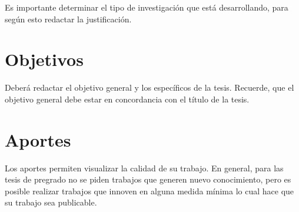 Es importante determinar el tipo de investigación que está desarrollando, para según esto redactar la justificación.

\section{Objetivos}
Deberá redactar el objetivo general y los específicos de la tesis. Recuerde, que el objetivo general debe estar en concordancia con el título de la tesis.


\section{Aportes}
Los aportes permiten visualizar la calidad de su trabajo. En general, para las tesis de pregrado no se piden trabajos que generen nuevo conocimiento, pero es posible realizar trabajos que innoven en alguna medida  mínima lo cual hace que su trabajo sea publicable.


